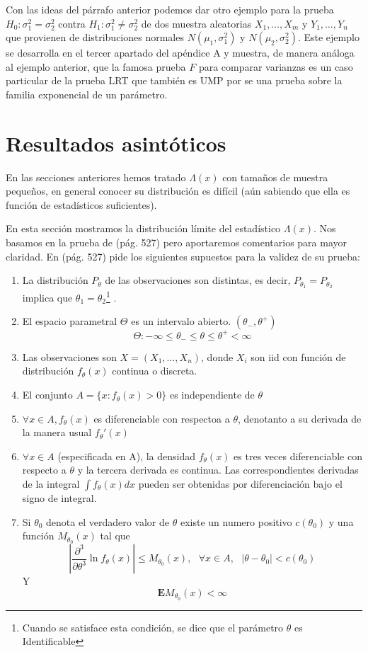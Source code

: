 \documentclass[peerreview]{IEEEtran}
\begin{document}
Con las ideas del párrafo anterior podemos dar otro ejemplo para la prueba $H_0:\sigma_1^2 = \sigma_2^2$ contra $H_1: \sigma_1^2 \ne \sigma_2^2$ de dos muestra aleatorias $X_1,\dots, X_m$ y $Y_1,\dots, Y_n$ que provienen de distribuciones normales $N(\mu_1, \sigma_1^2)$ y $N(\mu_2, \sigma_2^2)$. Este ejemplo se desarrolla en el tercer apartado del apéndice A y muestra, de manera análoga al ejemplo anterior, que la famosa prueba $F$ para comparar varianzas es un caso particular de la prueba LRT que también es UMP por se una prueba sobre la familia exponencial de un parámetro.

\section{Resultados asintóticos}
En las secciones anteriores hemos tratado $\Lambda(x)$ con tamaños de muestra pequeños, en general conocer su distribución es difícil (aún sabiendo que ella es función de estadísticos suficientes).

En esta sección mostramos la distribución límite del estadístico $\Lambda(x)$. Nos basamos en la prueba de \cite{Lehmann} (pág. 527) pero aportaremos comentarios para mayor claridad. 
En \cite{Lehmann} (pág. 527) pide los siguientes supuestos para la validez de su prueba: 
\begin{enumerate}
\item La distribución $P_\theta$ de las observaciones son distintas, es decir, $P_{\theta_1} = P_{\theta_2}$ implica que $\theta_1 =\theta_2$\footnote{ Cuando se satisface esta condición, se dice que el parámetro $\theta$ es
Identificable}
.
\item  El espacio parametral $\Theta$ es un intervalo abierto. $(\theta_{-},\theta^{+})$
\[\Theta: -\infty \leq  \theta _{-} \leq \theta \leq \theta^{+} < \infty \]
\item Las observaciones son $X =(X_1,\dots, X_n)$, donde $X_i$ son iid con función de distribución $f_\theta(x)$ continua o discreta.
\item El conjunto $A = \{  x:f_\theta(x) >0 \}$ es independiente de $\theta$
\item $\forall x \in A, f_\theta(x)$ es diferenciable con respectoa a $\theta$, denotanto a su derivada de la manera usual $f_\theta'(x)$
\item  $\forall x \in A$ (especificada en A), la densidad $f_\theta(x)$ es tres veces diferenciable con respecto a $\theta$ y la tercera derivada es continua. Las correspondientes derivadas de la integral $\int f_\theta(x)dx$ pueden ser obtenidas por diferenciación bajo el signo de integral.
\item Si $\theta_0$ denota el verdadero valor de $\theta$ existe un numero positivo $c(\theta_0)$ y una función $M_{\theta_0}(x)$ tal que 
\begin{equation}
\left|\frac{\partial^3}{\partial \theta^3} \ln f_\theta(x) \right| \leq M_{\theta_0}(x), \textrm{          } \forall x \in A, \textrm{     } |\theta-\theta_0| < c(\theta_0)
\end{equation}
Y
\begin{equation}
\mathbf{E}M_{\theta_0}(x) < \infty
\end{equation}
\end{enumerate}
\end{document}
